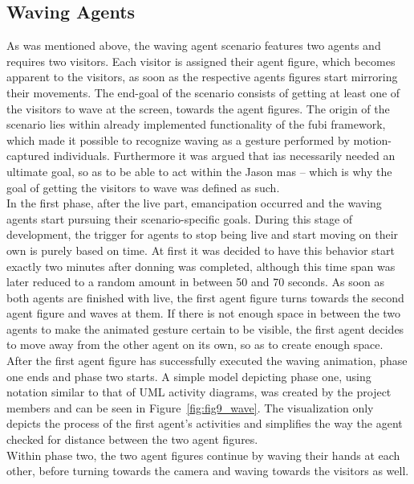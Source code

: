 \documentclass[draft,final]{vutinfth} %
\begin{document}
\subsection{Waving Agents}
\label{chap:waving}

As was mentioned above, the waving agent scenario features two agents and requires two \glspl{visitor}. 
Each \gls{visitor} is assigned their \gls{agent figure}, which becomes apparent to the \glspl{visitor}, as soon as the respective agents figures start mirroring their movements. 
The end-goal of the scenario consists of getting at least one of the \glspl{visitor} to wave at the screen, towards the \glspl{agent figure}. 
The origin of the scenario lies within already implemented functionality of the \gls{fubi} framework, which made it possible to recognize waving as a gesture performed by motion-captured individuals. 
Furthermore it was argued that \glspl{ia} necessarily needed an ultimate goal, so as to be able to act within the Jason \gls{mas} – which is why the goal of getting the \glspl{visitor} to wave was defined as such. \\
In the first phase, after the \gls{live} part, emancipation occurred and the waving agents start pursuing their scenario-specific goals. 
During this stage of development, the trigger for agents to stop being \gls{live} and start moving on their own is purely based on time. 
At first it was decided to have this behavior start exactly two minutes after donning was completed, although this time span was later reduced to a random amount in between 50 and 70 seconds. 
As soon as both agents are finished with \gls{live}, the first \gls{agent figure} turns towards the second \gls{agent figure} and waves at them. 
If there is not enough space in between the two agents to make the animated gesture certain to be visible, the first agent decides to move away from the other agent on its own, so as to create enough space. 
After the first \gls{agent figure} has successfully executed the waving animation, phase one ends and phase two starts. 
A simple model depicting phase one, using notation similar to that of UML activity diagrams, was created by the project members and can be seen in Figure~\ref{fig:fig9_wave}. 
The visualization only depicts the process of the first agent’s activities and simplifies the way the agent checked for distance between the two \glspl{agent figure}. \\
Within phase two, the two \glspl{agent figure} continue by waving their hands at each other, before turning towards the camera and waving towards the \glspl{visitor} as well. 
\end{document}
